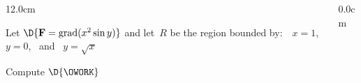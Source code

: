 \begin{frame}
\frametitle{}
\scriptsize
\begin{columns}
\begin{column}{12.0cm}

\EX Let $\D{{\bf F} = \text{grad}(x^2\sin y)}$ and let\, $R$ be the region bounded by: \,\, $x=1$, \, $y=0$, \, and \, $y=\sqrt{x}$

\vspace{0.2cm}

Compute \quad $\D{\OWORK}$

\vspace{0.2cm}

\SOL

\vspace{7.2cm}

\end{column}
\begin{column}{0.0cm}\end{column}
\end{columns}
\end{frame}

